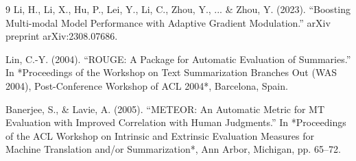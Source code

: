 \documentclass[conference]{IEEEtran}
\begin{document}
\begin{thebibliography}{9}
 Li, H., Li, X., Hu, P., Lei, Y., Li, C., Zhou, Y., ... \& Zhou, Y. (2023). ``Boosting Multi-modal Model Performance with Adaptive Gradient Modulation.'' arXiv preprint arXiv:2308.07686.

 Lin, C.-Y. (2004). ``ROUGE: A Package for Automatic Evaluation of Summaries.'' In *Proceedings of the Workshop on Text Summarization Branches Out (WAS 2004), Post-Conference Workshop of ACL 2004*, Barcelona, Spain.

 Banerjee, S., \& Lavie, A. (2005). ``METEOR: An Automatic Metric for MT Evaluation with Improved Correlation with Human Judgments.'' In *Proceedings of the ACL Workshop on Intrinsic and Extrinsic Evaluation Measures for Machine Translation and/or Summarization*, Ann Arbor, Michigan, pp. 65--72.

\end{thebibliography}
\end{document}
